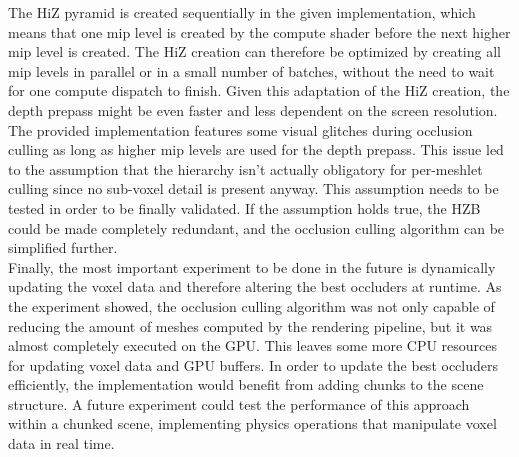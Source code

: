 \clearpage

\noindent
The \ac{HiZ} pyramid is created sequentially in the given implementation, which means that one mip level is 
created by the compute shader before the next higher mip level is created. The \ac{HiZ} creation can therefore 
be optimized by creating all mip levels in parallel or in a small number of batches, without the need to wait 
for one compute dispatch to finish. Given this adaptation of the \ac{HiZ} creation, the depth prepass might be 
even faster and less dependent on the screen resolution. \\

\noindent
The provided implementation features some visual glitches during occlusion culling as long as higher mip levels 
are used for the depth prepass. This issue led to the assumption that the hierarchy isn't actually obligatory 
for per-meshlet culling since no sub-voxel detail is present anyway. This assumption needs to be tested in 
order to be finally validated. If the assumption holds true, the \ac{HZB} could be made completely redundant, and 
the occlusion culling algorithm can be simplified further. \\

\noindent
Finally, the most important experiment to be done in the future is dynamically updating the voxel data and therefore 
altering the best occluders at runtime. As the experiment showed, the occlusion culling algorithm was not only 
capable of reducing the amount of meshes computed by the rendering pipeline, but it was almost completely executed 
on the \ac{GPU}. This leaves some more \ac{CPU} resources for updating voxel data and \ac{GPU} buffers. In order 
to update the best occluders efficiently, the implementation would benefit from adding chunks to the scene structure. 
A future experiment could test the performance of this approach within a chunked scene, implementing physics operations 
that manipulate voxel data in real time. 

